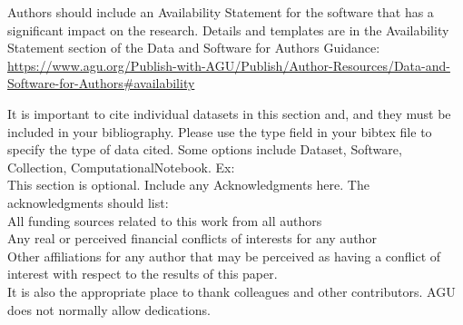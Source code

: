 \documentclass[draft]{agujournal2019}
\begin{document}
Authors should include an Availability Statement for the software that has a significant impact on the research. Details and templates are in the Availability Statement section of the Data and Software for Authors Guidance: \url{https://www.agu.org/Publish-with-AGU/Publish/Author-Resources/Data-and-Software-for-Authors#availability}

It is important to cite individual datasets in this section and, and they must be included in your bibliography. Please use the type field in your bibtex file to specify the type of data cited. Some options include Dataset, Software, Collection, ComputationalNotebook. Ex: 
\\


\acknowledgments
This section is optional. Include any Acknowledgments here.
The acknowledgments should list:\\
All funding sources related to this work from all authors\\
Any real or perceived financial conflicts of interests for any author\\
Other affiliations for any author that may be perceived as having a conflict of interest with respect to the results of this paper.\\
It is also the appropriate place to thank colleagues and other contributors. AGU does not normally allow dedications.



%
%







%
%
%
%
%
\end{document}
